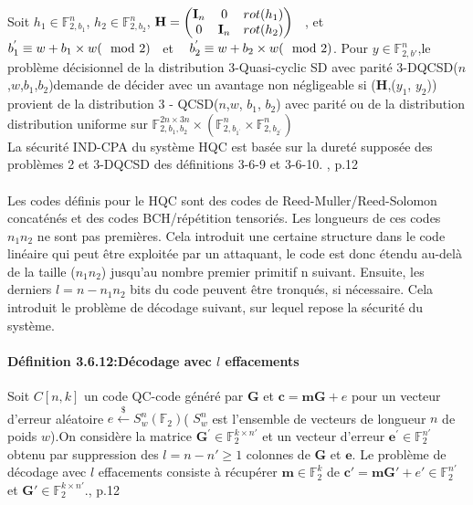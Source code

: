 \documentclass[12pt,openany]{report}
\begin{document}
Soit  $h_1 \in \mathbb{F}_{2,b_1}^n$, $h_2 \in \mathbb{F}_{2,b_2}^n $, $ \mathbf{H}= \begin{pmatrix}
\mathbf{I}_n & 0 & rot(h_1)\\
0 & \mathbf{I}_n & rot(h_2)
\end{pmatrix}  \hspace{0.3cm}$, et $ b_1^{'}\equiv w + b_1 \times w (\mod 2)\hspace{0.3cm}$et $\hspace{0.3cm} b_2^{'}\equiv w + b_2 \times w (\mod 2)$. Pour $ y \in \mathbb{F}_{2,b'}^n$,le problème décisionnel de la distribution 3-Quasi-cyclic SD avec parité 3-DQCSD($n$,$w$,$b_1$,$b_2$)demande de décider avec un avantage non négligeable si ($\mathbf{H}$,($y_1$, $y_2$)) provient de la distribution 3 - QCSD($n$,$ w$, $b_1$, $b_2$) avec parité ou de la distribution
distribution uniforme sur $ \mathbb{F}_{2,b_1,b_2}^{2n \times 3n} \times \left( \mathbb{F}_{2,b_{1^{'}}}^{n} \times  \mathbb{F}_{2,b_{2^{'}}}^{n} \right)$\\
La sécurité IND-CPA du système HQC est basée sur la dureté supposée des problèmes 2 et 3-DQCSD des définitions 3-6-9 et 3-6-10. \cite{melchor2020}, p.12\\
\paragraph{}
Les codes définis pour le HQC sont des codes de Reed-Muller/Reed-Solomon concaténés
et des codes BCH/répétition tensoriés. Les longueurs de ces codes $n_1n_2$ ne sont pas premières.
Cela introduit une certaine structure dans le code linéaire qui peut être exploitée par
un attaquant, le code est donc étendu au-delà de la taille ($n_1n_2$) jusqu'au nombre premier primitif n suivant. Ensuite, les derniers $l = n - n_1n_2$ bits du code peuvent être tronqués, si nécessaire. Cela introduit le problème de décodage suivant, sur lequel repose la sécurité du système.

\paragraph{Définition 3.6.12:Décodage avec $l$ effacements \\}

Soit $\mathit{C}\left[ n,k \right]$ un code QC-code généré par 
$\mathbf{G}$ et $\mathbf{c}=\mathbf{mG}+e $ pour un vecteur d'erreur aléatoire $e \overset{\$}{\gets}\mathit{S}_w^n\left(\mathbb{F}_2 \right) $( $\mathit{S}_w^n $ est l'ensemble de vecteurs de longueur $n$ de poids $w$).On considère la matrice $\mathbf{G}^{'} \in \mathbb{F}_2^{k \times n'} $ et un vecteur d'erreur $ \mathbf{e}^{'} \in \mathbb{F}_2^{n'}$ obtenu par suppression des $ l =n-n'\geq 1$ colonnes de $\mathbf{G}$ et $\mathbf{e}$. Le problème de décodage avec $l$ effacements consiste à récupérer $\mathbf{m} \in \mathbb{F}_2^k$ de $\mathbf{c'}=\mathbf{mG'}+e' \in \mathbb{F}_2^{n'}$ et $ \mathbf{G'} \in \mathbb{F}_2^{k \times n'}$.\cite{melchor2020}, p.12\\
\end{document}
